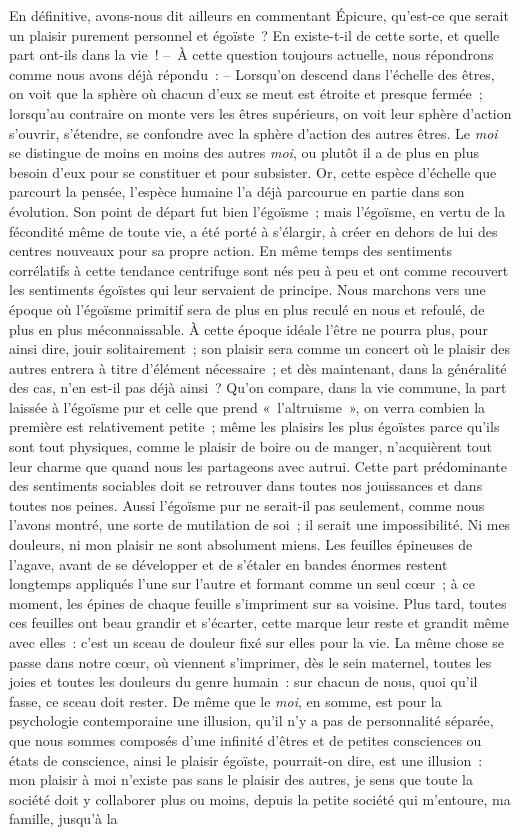 \documentclass[french,twoside]{book} %
\begin{document}
En définitive, avons-nous dit ailleurs en commentant Épicure, qu’est-ce que serait un plaisir purement personnel et égoïste ? En existe-t-il de cette sorte, et quelle part ont-ils dans la vie ! – À cette question toujours actuelle, nous répondrons comme nous avons déjà répondu : – Lorsqu’on descend dans l’échelle des êtres, on voit que la sphère où chacun d’eux se meut est étroite et presque fermée ; lorsqu’au contraire on monte vers les êtres supérieurs, on voit leur sphère d’action s’ouvrir, s’étendre, se confondre avec la sphère d’action des autres êtres. Le \emph{moi} se distingue de moins en moins des autres \emph{moi}, ou plutôt il a de plus en plus besoin d’eux pour se constituer et pour subsister. Or, cette espèce d’échelle que parcourt la pensée, l’espèce humaine l’a déjà parcourue en partie dans son évolution. Son point de départ fut bien l’égoïsme ; mais l’égoïsme, en vertu de la fécondité même de toute vie, a été porté à s’élargir, à créer en dehors de lui des centres nouveaux pour sa propre action. En même temps des sentiments corrélatifs à cette tendance centrifuge sont nés peu à peu et ont comme recouvert les sentiments égoïstes qui leur servaient de principe. Nous marchons vers une époque où l’égoïsme primitif sera de plus en plus reculé en nous et refoulé, de plus en plus méconnaissable. À cette époque idéale l’être ne pourra plus, pour ainsi dire, jouir solitairement ; son plaisir sera comme un concert où le plaisir des autres entrera à titre d’élément nécessaire ; et dès maintenant, dans la généralité des cas, n’en est-il pas déjà ainsi ? Qu’on compare, dans la vie commune, la part laissée à l’égoïsme pur et celle que prend « l’altruisme », on verra combien la première est relativement petite ; même les plaisirs les plus égoïstes parce qu’ils sont tout physiques, comme le plaisir de boire ou de manger, n’acquièrent tout leur charme que quand nous les partageons avec autrui. Cette part prédominante des sentiments sociables doit se retrouver dans toutes nos jouissances et dans toutes nos peines. Aussi l’égoïsme pur ne serait-il pas seulement, comme nous l’avons montré, une sorte de mutilation de soi ; il serait une impossibilité. Ni mes douleurs, ni mon plaisir ne sont absolument miens. Les feuilles épineuses de l’agave, avant de se développer et de s’étaler en bandes énormes restent longtemps appliqués l’une sur l’autre et formant comme un seul cœur ; à ce moment, les épines de chaque feuille s’impriment sur sa voisine. Plus tard, toutes ces feuilles ont beau grandir et s’écarter, cette marque leur reste et grandit même avec elles : c’est un sceau de douleur fixé sur elles pour la vie. La même chose se passe dans notre cœur, où viennent s’imprimer, dès le sein maternel, toutes les joies et toutes les douleurs du genre humain : sur chacun de nous, quoi qu’il fasse, ce sceau doit rester. De même que le \emph{moi}, en somme, est pour la psychologie contemporaine une illusion, qu’il n’y a pas de personnalité séparée, que nous sommes composés d’une infinité d’êtres et de petites consciences ou états de conscience, ainsi le plaisir égoïste, pourrait-on dire, est une illusion : mon plaisir à moi n’existe pas sans le plaisir des autres, je sens que toute la société doit y collaborer plus ou moins, depuis la petite société qui m’entoure, ma famille, jusqu’à la 
\end{document}
